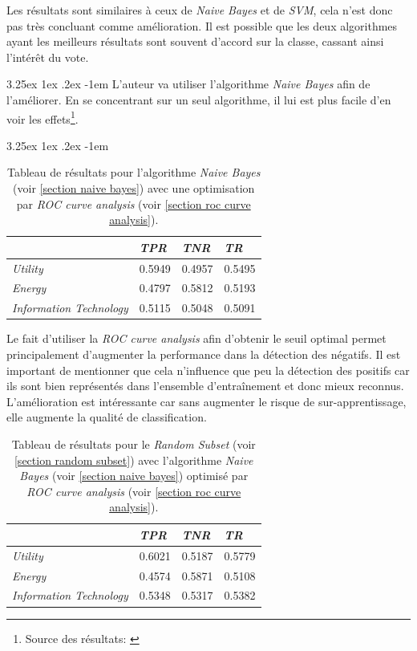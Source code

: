 \documentclass[a4paper, 11pt]{article}
\makeatletter
\renewcommand\paragraph{\@startsection{paragraph}{5}{\z@}%
  {3.25ex \@plus1ex \@minus.2ex}%
  {-1em}%
  {\normalfont\normalsize\bfseries}}
\makeatother
\begin{document}
Les résultats sont similaires à ceux de \textit{Naive Bayes} et de \textit{SVM}, cela n'est donc pas très
concluant comme amélioration. Il est possible que les deux algorithmes ayant les meilleurs résultats sont
souvent d'accord sur la classe, cassant ainsi l'intérêt du vote.

\paragraph{}
L'auteur va utiliser l'algorithme \textit{Naive Bayes} afin de l'améliorer. En se concentrant sur un seul algorithme,
il lui est plus facile d'en voir les effets\footnote{Source des résultats: \cite{machine_learning_automated_trading}}.

\paragraph{}
\begin{table}[h!]
	\centering
\begin{tabular}{|l|l|l|l|}
	\hline
	\ & \textit{TPR} & \textit{TNR} & \textit{TR}\\
	\hline
	\textit{Utility} & 0.5949 & 0.4957 & 0.5495 \\
	\hline
	\textit{Energy} & 0.4797 & 0.5812 & 0.5193\\
	\hline
	\textit{Information Technology} & 0.5115 & 0.5048 & 0.5091\\
	\hline
\end{tabular}
\caption{Tableau de résultats pour l'algorithme \textit{Naive Bayes} (voir \ref{section naive bayes}) avec une optimisation
par \textit{ROC curve analysis} (voir \ref{section roc curve analysis}).}
\end{table}

Le fait d'utiliser la \textit{ROC curve analysis} afin d'obtenir le seuil optimal permet principalement d'augmenter
la performance dans la détection des négatifs. Il est important de mentionner que cela n'influence que peu
la détection des positifs car ils sont bien représentés dans l'ensemble d'entraînement et donc mieux reconnus.
L'amélioration est intéressante car sans augmenter le risque de sur-apprentissage, elle augmente la qualité
de classification.

\begin{table}[h!]
	\centering
\begin{tabular}{|l|l|l|l|}
	\hline
	\ & \textit{TPR} & \textit{TNR} & \textit{TR}\\
	\hline
	\textit{Utility} & 0.6021 & 0.5187 & 0.5779 \\
	\hline
	\textit{Energy} & 0.4574 & 0.5871 & 0.5108\\
	\hline
	\textit{Information Technology} & 0.5348 & 0.5317 & 0.5382\\
	\hline
\end{tabular}
\caption{Tableau de résultats pour le \textit{Random Subset} (voir \ref{section random subset}) avec l'algorithme 
\textit{Naive Bayes} (voir \ref{section naive bayes}) optimisé par \textit{ROC curve analysis} 
(voir \ref{section roc curve analysis}).}
\end{table}
\end{document}
